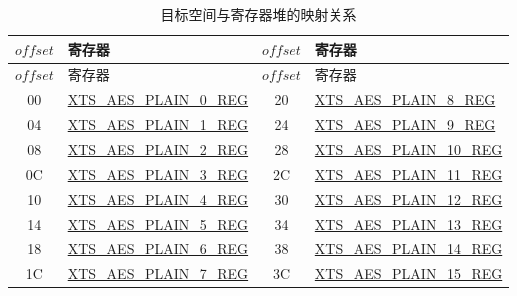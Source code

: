 \documentclass[main\_\_CN.tex]{subfiles}
\begin{document}
\begin{longtable}[c]
{ |c|p{4.5cm} |c|p{4.5cm}|}
\caption{目标空间与寄存器堆的映射关系} 
\label{table:ManualEncryptionDataPadding}\\
\hline
\rowcolor{lightgray}
\begin{math} offset \end{math}&  寄存器  & \begin{math} offset \end{math} &  寄存器 \\\hline
\endfirsthead
\hline
\rowcolor{lightgray}
\begin{math} offset \end{math} &  寄存器  & \begin{math} offset \end{math} &  寄存器   \\\hline
\endhead
\endfoot
\hexprefix{}00 & \hyperref[regdesc:XTSAESPLAINNREG]{XTS\_AES\_PLAIN\_0\_REG} & \hexprefix{}20 & \hyperref[regdesc:XTSAESPLAINNREG]{XTS\_AES\_PLAIN\_8\_REG} \\\hline
\hexprefix{}04 & \hyperref[regdesc:XTSAESPLAINNREG]{XTS\_AES\_PLAIN\_1\_REG} & \hexprefix{}24 & \hyperref[regdesc:XTSAESPLAINNREG]{XTS\_AES\_PLAIN\_9\_REG} \\\hline
\hexprefix{}08 & \hyperref[regdesc:XTSAESPLAINNREG]{XTS\_AES\_PLAIN\_2\_REG} & \hexprefix{}28 & \hyperref[regdesc:XTSAESPLAINNREG]{XTS\_AES\_PLAIN\_10\_REG} \\\hline
\hexprefix{}0C & \hyperref[regdesc:XTSAESPLAINNREG]{XTS\_AES\_PLAIN\_3\_REG} & \hexprefix{}2C & \hyperref[regdesc:XTSAESPLAINNREG]{XTS\_AES\_PLAIN\_11\_REG} \\\hline
\hexprefix{}10 & \hyperref[regdesc:XTSAESPLAINNREG]{XTS\_AES\_PLAIN\_4\_REG} & \hexprefix{}30 & \hyperref[regdesc:XTSAESPLAINNREG]{XTS\_AES\_PLAIN\_12\_REG} \\\hline
\hexprefix{}14 & \hyperref[regdesc:XTSAESPLAINNREG]{XTS\_AES\_PLAIN\_5\_REG} & \hexprefix{}34 & \hyperref[regdesc:XTSAESPLAINNREG]{XTS\_AES\_PLAIN\_13\_REG} \\\hline
\hexprefix{}18 & \hyperref[regdesc:XTSAESPLAINNREG]{XTS\_AES\_PLAIN\_6\_REG} & \hexprefix{}38 & \hyperref[regdesc:XTSAESPLAINNREG]{XTS\_AES\_PLAIN\_14\_REG} \\\hline
\hexprefix{}1C & \hyperref[regdesc:XTSAESPLAINNREG]{XTS\_AES\_PLAIN\_7\_REG} & \hexprefix{}3C & \hyperref[regdesc:XTSAESPLAINNREG]{XTS\_AES\_PLAIN\_15\_REG} \\\hline
\end{longtable}
\end{document}

